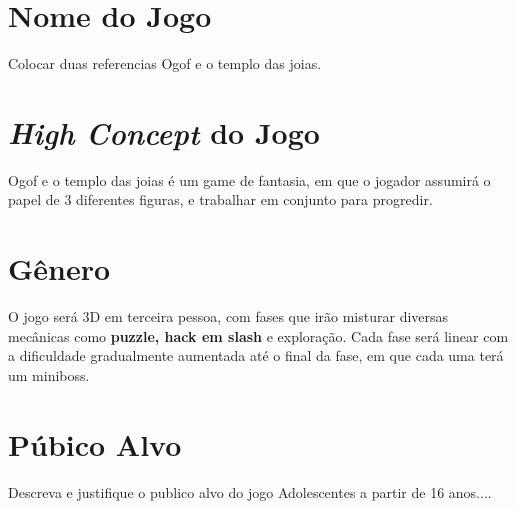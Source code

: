 \section{Nome do Jogo}
Colocar duas referencias
Ogof e o templo das joias.

\section{\textit{High Concept} do Jogo}
Ogof e o templo das joias é um game de fantasia, em que o jogador assumirá o papel de 3 diferentes figuras, e trabalhar em conjunto para progredir.



\section{Gênero}

O jogo será 3D em terceira pessoa, com fases que irão misturar diversas mecânicas como \textbf{puzzle, hack em slash} e exploração. Cada fase será linear com a dificuldade gradualmente aumentada até o final da fase, em que cada uma terá um miniboss.


\section{Púbico Alvo}

Descreva e justifique o publico alvo do jogo
Adolescentes a partir de 16 anos....
\vfill
\pagebreak


